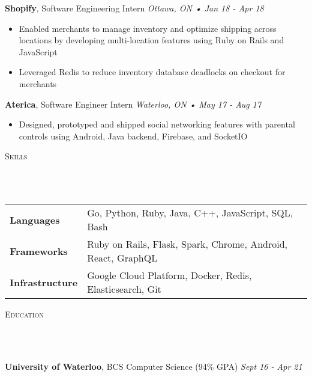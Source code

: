 \documentclass[a4paper, 12pt, hidelinks]{article}
\newcommand{\lineunder} {
    \vspace*{-8pt} \\
    \hrulefill \\
}
\newcommand{\header} [1] {
    \color{bigtext}
    {\hspace*{-4pt}\vspace*{6pt} \textsc{#1}}
    \vspace*{-6pt}
    \color{weaktext}
    \lineunder
    \vspace{6pt}
    \color{bodytext}
}
\newcommand{\nolocheader} [3] {
    \color{bigtext}\textbf{#1}, {#2}
    \color{weaktext}\hfill{\small\textit{#3}}\\
    \vspace{-2mm} \color{bodytext}
}
\newcommand{\jobheader} [4] {
    \nolocheader{#1}{#2}{\small\textit{#3} • \textit{#4}}
}
\begin{document}
\jobheader{Shopify}{Software Engineering Intern}{Ottawa, ON}{Jan 18 - Apr 18}
\begin{itemize}[leftmargin=1.8em, rightmargin=0.8em] \itemsep 1pt \color{bodytext}
    \item Enabled merchants to manage inventory and optimize shipping across locations by developing
    multi-location features using Ruby on Rails and JavaScript
    \item Leveraged Redis to reduce inventory database deadlocks on checkout for merchants
\end{itemize}

\jobheader{Aterica}{Software Engineer Intern}{Waterloo, ON}{May 17 - Aug 17}
\begin{itemize}[leftmargin=1.8em, rightmargin=0.8em] \itemsep 1pt \color{bodytext}
    \item Designed, prototyped and shipped social networking features with parental controls using Android,
    Java backend, Firebase, and SocketIO
\end{itemize}

\header{Skills}

\hspace{-10pt}
\begin{tabular}{ l l }
    \color{bigtext}\textbf{Languages}\color{bodytext} & Go, Python, Ruby, Java, C++, JavaScript, SQL, Bash \\[2pt]
    \color{bigtext}\textbf{Frameworks}\color{bodytext} & Ruby on Rails, Flask, Spark, Chrome, Android, React, GraphQL \\[2pt]
    \color{bigtext}\textbf{Infrastructure}\color{bodytext} & Google Cloud Platform, Docker, Redis, Elasticsearch, Git
\end{tabular}
\vspace{3mm}

\header{Education}
\nolocheader{University of Waterloo}{BCS Computer Science (94\% GPA)}{Sept 16 - Apr 21}
\end{document}
